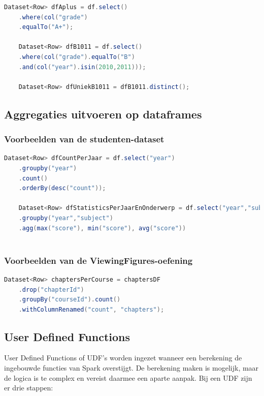 \documentclass[a4paper,10pt,twoside]{report}
\begin{document}
\begin{lstlisting}[language=Java]
	Dataset<Row> dfAplus = df.select()
	.where(col("grade")
	.equalTo("A+");
	
	Dataset<Row> dfB1011 = df.select()
	.where(col("grade").equalTo("B")
	.and(col("year").isin(2010,2011)));
	
	Dataset<Row> dfUniekB1011 = dfB1011.distinct();
\end{lstlisting}

\subsection{Aggregaties uitvoeren op dataframes}

\subsubsection{Voorbeelden van de studenten-dataset}

\begin{lstlisting}[language=Java]
	Dataset<Row> dfCountPerJaar = df.select("year")
	.groupby("year")
	.count()
	.orderBy(desc("count"));
	
	Dataset<Row> dfStatisticsPerJaarEnOnderwerp = df.select("year","subject","score")
	.groupby("year","subject")
	.agg(max("score"), min("score"), avg("score"))
	
\end{lstlisting}

\subsubsection{Voorbeelden van de ViewingFigures-oefening}

\begin{lstlisting}[language=Java]
	Dataset<Row> chaptersPerCourse = chaptersDF
	.drop("chapterId")
	.groupBy("courseId").count()
	.withColumnRenamed("count", "chapters");
\end{lstlisting}


\subsection{User Defined Functions}

User Defined Functions of UDF's worden ingezet wanneer een berekening de ingebouwde functies van Spark overstijgt. De berekening maken is mogelijk, maar de logica is te complex en vereist daarmee een aparte aanpak. Bij een UDF zijn er drie stappen:
\end{document}
